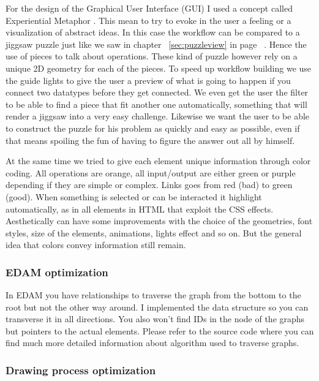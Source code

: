 \documentclass[a4paper,10pt]{article}
\begin{document}
    For the design of the Graphical User Interface (GUI) I used a concept called Experiential Metaphor \cite{games}. This mean to try to evoke in the user a feeling or a visualization of abstract ideas. In this case the workflow can be compared to a jiggsaw puzzle just like we saw in chapter ~\ref{sec:puzzleview} in page ~\pageref{sec:puzzleview}. Hence the use of pieces to talk about operations. These kind of puzzle however rely on a unique 2D geometry for each of the pieces. To speed up workflow building we use the guide lights to give the user a preview of what is going to happen if you connect two datatypes before they get connected. We even get the user the filter to be able to find a piece that fit another one automatically, something that will render a jiggsaw into a very easy challenge. Likewise we want the user to be able to construct the puzzle for his problem as quickly and easy as possible, even if that means spoiling the fun of having to figure the answer out all by himself.\vspace{3 mm}

    At the same time we tried to give each element unique information through color coding. All operations are orange, all input/output are either green or purple depending if they are simple or complex. Links goes from red (bad) to green (good). When something is selected or can be interacted it highlight automatically, as in all elements in HTML that exploit the CSS effects. Aesthetically can have some improvements with the choice of the geometries, font styles, size of the elements, animations, lights effect and so on. But the general idea that colors convey information still remain.

    \subsubsection{EDAM optimization}

    In EDAM you have relationships to traverse the graph from the bottom to the root but not the other way around. I implemented the data structure so you can transverse it in all directions. You also won't find IDs in the node of the graphs but pointers to the actual elements. Please refer to the source code where you can find much more detailed information about algorithm used to traverse graphs.

    \subsubsection{Drawing process optimization}
  
\end{document}
